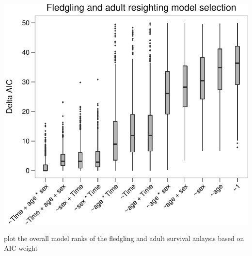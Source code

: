 \documentclass[]{article}
\begin{document}
\begin{center}\includegraphics{Ceuta_ASR_Matrix_Modeling_files/figure-latex/unnamed-chunk-57-1} \end{center}

plot the overall model ranks of the fledgling and adult survival
anlaysis based on AIC weight
\end{document}
